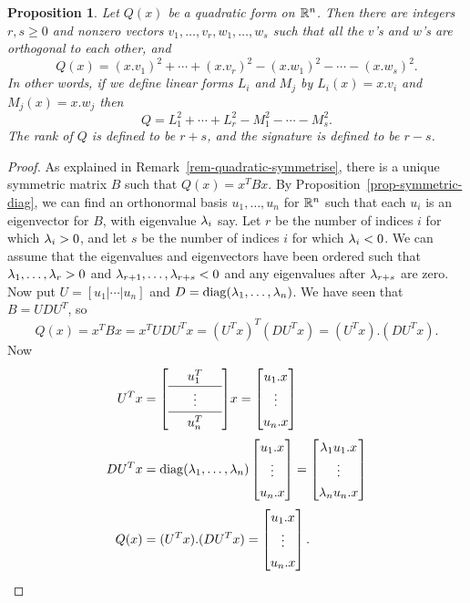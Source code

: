 \documentclass[reqno]{amsart}
\newtheorem{proposition}[theorem]{Proposition}
\theoremstyle{definition}
\newcommand{\dfn}[1]{\emph{{#1}}\index{#1}}
\begin{document}
\begin{proposition}\label{prop-quadratic-diag}
 Let $Q(x)$ be a quadratic form on ${\mathbb{R}}^n$.  Then there are integers
 $r,s\geq 0$ and nonzero vectors $v_1,\dotsc,v_r,w_1,\dotsc,w_s$ such
 that all the $v$'s and $w$'s are orthogonal to each other, and
 \[ Q(x) = (x.v_1)^2 + \dotsb + (x.v_r)^2 
           - (x.w_1)^2 - \dotsb - (x.w_s)^2.
 \]
 In other words, if we define linear forms $L_i$ and $M_j$ by
 $L_i(x)=x.v_i$ and $M_j(x)=x.w_j$ then 
 \[ Q = L_1^2 + \dotsb + L_r^2 - M_1^2 - \dotsb - M_s^2. \]
 The \dfn{rank} of $Q$ is defined to be $r+s$, and the
 \dfn{signature} is defined to be $r-s$.
\end{proposition}
\begin{proof}
 As explained in Remark~\ref{rem-quadratic-symmetrise}, there is a
 unique symmetric matrix $B$ such that $Q(x)=x^TBx$.  By
 Proposition~\ref{prop-symmetric-diag}, we can find an orthonormal
 basis $u_1,\dotsc,u_n$ for ${\mathbb{R}}^n$ such that each $u_i$ is an
 eigenvector for $B$, with eigenvalue $\lambda_i$ say.  Let $r$ be the
 number of indices $i$ for which $\lambda_i>0$, and let $s$ be the number
 of indices $i$ for which $\lambda_i<0$.  We can assume that the
 eigenvalues and eigenvectors have been ordered such that
 $\lambda_1,\dotsc,\lambda_r>0$ and $\lambda_{r+1},\dotsc,\lambda_{r+s}<0$ and any
 eigenvalues after $\lambda_{r+s}$ are zero.  Now put
 $U=[u_1|\dotsb|u_n]$ and $D=\operatorname{diag}(\lambda_1,\dotsc,\lambda_n)$.  We have seen
 that $B=UDU^T$, so 
 \[ Q(x)=x^TBx=x^TUDU^Tx = (U^Tx)^T (DU^Tx) = (U^Tx).(DU^Tx). \]
 Now 
 \begin{align*}
  U^Tx &= {\renewcommand{\arraystretch}{1.3}
   \left[\begin{array}{ccc}
    & u_1^T & \\ \hline
    & \vdots & \\ \hline
    & u_n^T & 
   \end{array}\right]}
   x 
   = \bbm u_1.x \\ \vdots \\ u_n.x \ebm \\
  DU^Tx &= 
   \diag(\lm_1,\dotsc,\lm_n) 
   \bbm u_1.x \\ \vdots \\ u_n.x \ebm 
   = 
   \bbm \lm_1 u_1.x \\ \vdots \\ \lm_n u_n.x \ebm \\
  Q(x) &= (U^Tx).(DU^Tx) = 
   \bbm u_1.x \\ \vdots \\ u_n.x \ebm . 

\end{align*}
\end{proof}
\end{document}

